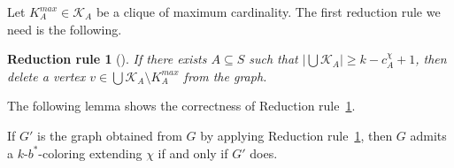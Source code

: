 \documentclass[runningheads, envcountsame]{llncs}
\newcommand{\seq}{\subseteq}
\newcommand{\ca}{\mathcal}
\newtheorem{rr}[theorem]{Reduction rule}
\begin{document}
Let $K_A^{max} \in \ca K_A$ be a clique of maximum cardinality.
The first reduction rule we need is the following.

\begin{rr}[{\cite[Reduction Rule 19]{JaffkeLS23}}]\label{rr:1}
If there exists $A \seq S$ such that $|\bigcup \ca K_A| \ge k - c_A^\chi + 1$, then delete a vertex $v \in \bigcup \ca K_A \setminus K_A^{max}$ from the graph.
\end{rr}

The following lemma shows the correctness of Reduction rule~\ref{rr:1}.

\begin{lemma}\label{lem:rr1}
If $G'$ is the graph obtained from $G$ by applying Reduction rule~\ref{rr:1}, then $G$ admits a $k$-$b^*$-coloring extending $\chi$ if and only if $G'$ does.
\end{lemma}
\end{document}
